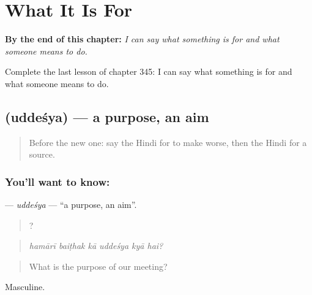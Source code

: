 
\chapter{What It Is For}
\label{ch:hi-what-it-is-for}

\begin{chapteropening}
\textbf{By the end of this chapter:} \emph{I can say what something is for and what someone means to do.}

Complete the last lesson of chapter 345: I can say what something is for and what someone means to do.
\end{chapteropening}

\section[\texorpdfstring{\hi{उद्देश्य} (uddeśya)}{उद्देश्य (uddeśya)}]{ (uddeśya) — a purpose, an aim}

\label{lesson:HI-C345-uddesya}



\begin{quote}
Before the new one: say the Hindi for to make worse, then the Hindi for a source.
\end{quote}

\subsection*{You'll want to know: }
\textbf{} — \emph{uddeśya} — \textquotedblleft{}a purpose, an aim\textquotedblright{}.

\begin{quote}
     ?
\end{quote}

\begin{quote}
\emph{hamārī baiṭhak kā uddeśya kyā hai?}
\end{quote}

\begin{quote}
What is the purpose of our meeting?
\end{quote}

Masculine.

